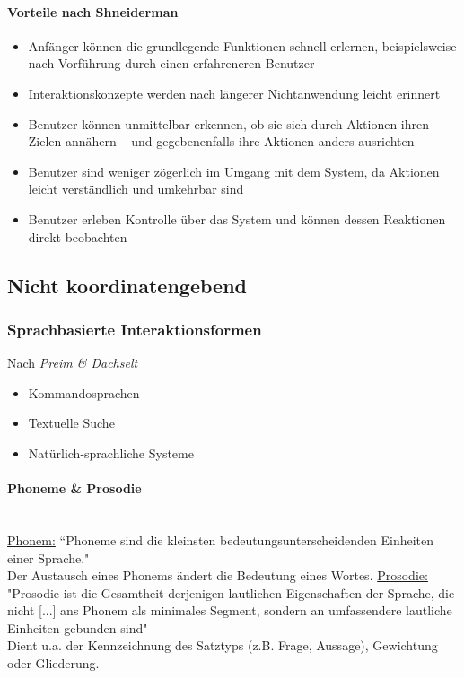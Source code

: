 \documentclass
[
	8pt,		%
	ngerman,	%
	a4paper,	%
	landscape,	%
	final		%
]{extarticle}
\begin{document}
\begin{multicols*}{4}
	\paragraph{Vorteile nach Shneiderman}
	\begin{itemize}
		\item Anfänger können die grundlegende Funktionen schnell erlernen,
		      beispielsweise nach Vorführung durch einen erfahreneren Benutzer
		\item Interaktionskonzepte werden nach längerer Nichtanwendung leicht
		      erinnert
		\item Benutzer können unmittelbar erkennen, ob sie sich durch Aktionen
		      ihren Zielen annähern – und gegebenenfalls ihre Aktionen anders
		      ausrichten
		\item Benutzer sind weniger zögerlich im Umgang mit dem System, da
		      Aktionen leicht verständlich und umkehrbar sind
		\item Benutzer erleben Kontrolle über das System und können dessen
		      Reaktionen direkt beobachten
	\end{itemize}
	\subsection{Nicht koordinatengebend}
	\subsubsection{Sprachbasierte Interaktionsformen}
	Nach \emph{Preim \& Dachselt}
	\begin{itemize}
		\item Kommandosprachen
		\item Textuelle Suche
		\item Natürlich-sprachliche Systeme
	\end{itemize}
	\paragraph{Phoneme \& Prosodie}\mbox{}\\
	\underline{Phonem:} “Phoneme sind die kleinsten bedeutungsunterscheidenden
	Einheiten einer Sprache." \\ Der Austausch eines Phonems ändert die Bedeutung
	eines Wortes.
	\underline{Prosodie:} "Prosodie ist die Gesamtheit derjenigen lautlichen
	Eigenschaften der Sprache, die nicht [...] ans Phonem als minimales Segment,
	sondern an umfassendere lautliche Einheiten gebunden sind" \\ Dient u.a. der
	Kennzeichnung des Satztyps (z.B. Frage, Aussage), Gewichtung oder Gliederung.

\end{multicols*}
\end{document}
